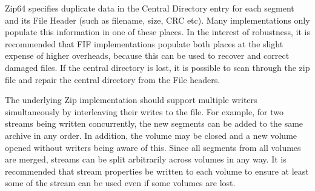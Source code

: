 \documentclass[12pt, conference]{IEEEtran}
\begin{document}
Zip64 specifies duplicate data in the Central Directory entry for each
segment and its File Header (such as filename, size, CRC etc). Many
implementations only populate this information in one of these
places. In the interest of robustness, it is recommended that FIF
implementations populate both places at the slight expense of higher
overheads, because this can be used to recover and correct damaged
files. If the central directory is lost, it is possible to scan
through the zip file and repair the central directory from the File
headers.

The underlying Zip implementation should support multiple writers
simultaneously by interleaving their writes to the file. For example,
for two streams being written concurrently, the new segments can be
added to the same archive in any order. In addition, the volume may be
closed and a new volume opened without writers being aware of
this. Since all segments from all volumes are merged, streams can be
split arbitrarily across volumes in any way. It is recommended that
stream properties be written to each volume to ensure at least some of
the stream can be used even if some volumes are lost.


\end{document}

